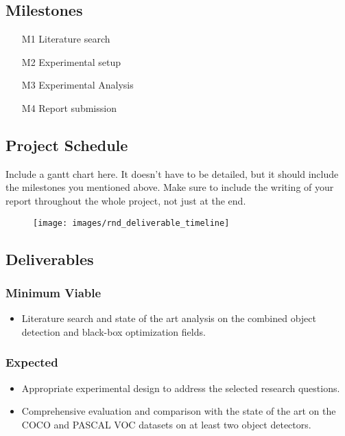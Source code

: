\documentclass[thesis]{mas_proposal}
\begin{document}
\subsection{Milestones}
\begin{enumerate}
    \item[M1] Literature search
    \item[M2] Experimental setup
    \item[M3] Experimental Analysis
    \item[M4] Report submission
\end{enumerate}

\subsection{Project Schedule}
Include a gantt chart here. It doesn't have to be detailed, but it should include the milestones you mentioned above.
Make sure to include the writing of your report throughout the whole project, not just at the end.

\begin{figure}[h!]
    \caption{}
    \texttt{[image: images/rnd\_deliverable\_timeline]}
    \label{}
\end{figure}

\subsection{Deliverables}
\subsubsection*{Minimum Viable}

\begin{itemize}
    \item Literature search and state of the art analysis on the  combined object detection and black-box optimization  fields.

\end{itemize}

\subsubsection*{Expected}
\begin{itemize}
    \item Appropriate experimental design to address the selected research questions.
    \item Comprehensive evaluation and comparison with the state of the art on the COCO and PASCAL VOC datasets on at least two object detectors.
\end{itemize}
\end{document}
